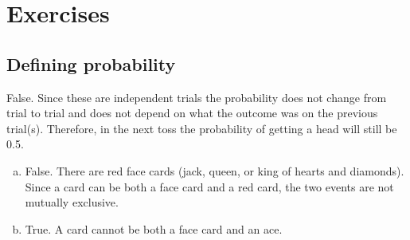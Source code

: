 \section{Exercises}


\subsection{Defining probability}



{False. Since these are independent trials the probability does not change from trial to trial and does not depend on what the outcome was on the previous trial(s). Therefore, in the next toss the probability of getting a head will still be 0.5.}


{
\begin{enumerate}[(a)]
\item False. There are red face cards (jack, queen, or king of hearts and diamonds). Since a card can be both a face card and a red card, the two events are not mutually exclusive.
\item True. A card cannot be both a face card and an ace.
\end{enumerate}
}


